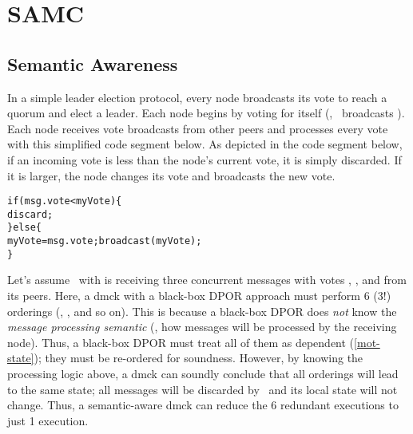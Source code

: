 \section{SAMC}
\label{sam-samc}

\subsection{Semantic Awareness}

In a simple leader election protocol, every node broadcasts its vote to reach a
quorum and elect a leader.  Each node begins by voting for itself (\eg, \ntwo\
broadcasts ).  Each node receives vote broadcasts from other peers
and processes every vote with this simplified code segment below.  As depicted
in the code segment below, if an incoming vote is less than the node's current
vote, it is simply discarded.  If it is larger, the node changes its vote and
broadcasts the new vote.

\begin{minipage}{\textwidth}
\begin{alltt}
\vfive
     if (msg.vote < myVote) \{
       discard;
     \} else \{
       myVote = msg.vote; broadcast(myVote);
     \}
\end{alltt}
\vfive
\end{minipage}



Let's assume \nfour\ with  is receiving three concurrent messages
with votes \ts{1}, \ts{2}, and \ts{3} from its peers.  Here, a dmck with a
black-box DPOR approach must perform 6 (3!) orderings (\ts{123}, \ts{132}, and
so on).  This is because a black-box DPOR does {\em not} know the {\em message
processing semantic} (\ie, how messages will be processed by the receiving
node).  Thus, a black-box DPOR must treat all of them as dependent
(\sec\ref{mot-state}); they must be re-ordered for soundness.  However, by
knowing the processing logic above, a dmck can soundly conclude that all
orderings will lead to the same state; all messages will be discarded by \nfour\
and its local state will not change.  Thus, a semantic-aware dmck can reduce the
6 redundant executions to just 1 execution.

